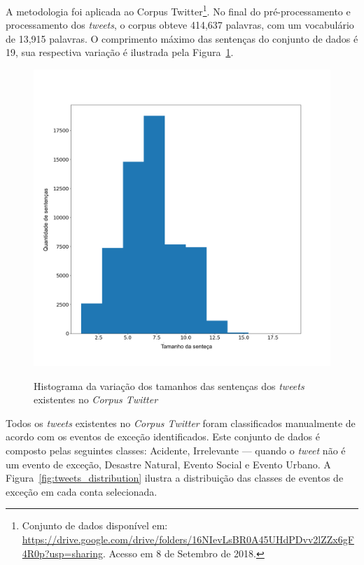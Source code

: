 \documentclass[
	12pt,				%
	oneside,			%
	a4paper,			%
	english,			%
	brazil				%
	]{abntex2ppgsi}
\begin{document}
{{A metodologia foi aplicada ao Corpus Twitter\footnote{Conjunto de dados disponível em: \url{https://drive.google.com/drive/folders/16NIevLsBR0A45UHdPDvv2lZZx6gF4R0p?usp=sharing}. Acesso em 8 de Setembro de 2018.}. No final do pré-processamento e processamento dos \textit{tweets}, o corpus obteve 414,637 palavras, com um vocabulário de 13,915 palavras. O comprimento máximo das sentenças do conjunto de dados é 19, sua respectiva variação é ilustrada pela Figura~\ref{fig:corpus_metrics}.
 
\begin{figure}[!htb]
	\centering
 	  \caption{Histograma da variação dos tamanhos das sentenças dos \textit{tweets} existentes no \textit{Corpus Twitter}}
		\includegraphics[width=1\linewidth]{images/corpus_metrics_pt.png}
	\label{fig:corpus_metrics}
\end{figure}

Todos os \textit{tweets} existentes no \textit{Corpus Twitter} foram classificados manualmente de acordo com os eventos de exceção identificados. Este conjunto de dados é composto pelas seguintes classes: Acidente, Irrelevante --- quando o \textit{tweet} não é um evento de exceção, Desastre Natural, Evento Social e Evento Urbano. A Figura~\ref{fig:tweets_distribution} ilustra a distribuição das classes de eventos de exceção em cada conta selecionada.

}}
\end{document}
